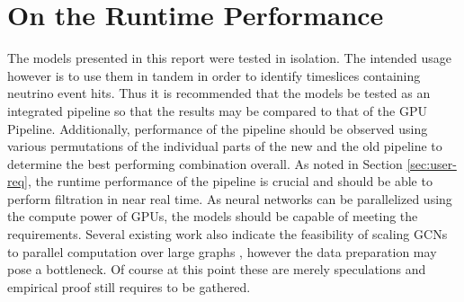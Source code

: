 \section{On the Runtime Performance}
The models presented in this report were tested in isolation. The
intended usage however is to use them in tandem in order to identify
timeslices containing neutrino event hits. Thus it is recommended that
the models be tested as an integrated pipeline so that the results may
be compared to that of the GPU Pipeline. Additionally, performance of
the pipeline should be observed using various permutations of the
individual parts of the new and the old pipeline to determine the best
performing combination overall. As noted in Section
\ref{sec:user-req}, the runtime performance of the pipeline is crucial
and should be able to perform filtration in near real time. As neural
networks can be parallelized using the compute power of GPUs, the
models should be capable of meeting the requirements. Several existing
work also indicate the feasibility of scaling GCNs to parallel
computation over large graphs \cite{ma2019high, ma2019neugraph,
  zeng2019accurate}, however the data preparation may pose a
bottleneck. Of course at this point these are merely speculations and
empirical proof still requires to be gathered.

